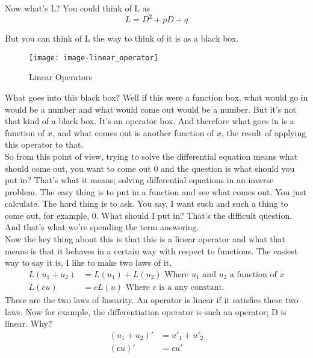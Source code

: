 \clearpage
Now what's L? You could think of L as
\begin{equation*}
  L = D^2 + pD + q 
\end{equation*}

But you can think of L the way to think of it is as a black box.
\begin{figure}[ht!]
  \centering
  \texttt{[image: image-linear\_operator]}
  \caption{Linear Operators}
\end{figure}

What goes into this black box? Well if this were a function box, what
would go in would be a number and what would come out would be a number.
But it's not that kind of a black box. It's an {\color{blue} operator box}.
And therefore what goes in is a function of $x$, and what comes out is another function of $x$,
the result of applying this operator to that.\\
So from this point of view, trying to solve the differential equation means what should come
out, you want to come out 0 and the question is what should you put in?
That's what it means; solving differential equations in an {\color{blue} inverse problem}.
The easy thing is to put in a function and see what comes out.
You just calculate. The hard thing is to ask.
You say, I want such and such a thing to come out, for example, $0$.
What should I put in? That's the difficult question.
And that's what we're spending the term answering.\\

Now the key thing about this is that this is a linear operator
and what that means is that it behaves in a certain way with respect to functions.
The easiest way to say it is, I like to make two laws of it,
\begin{align*}
  L(u _1 + u _2 ) &= L(u_1) + L(u_2)
  \text{ Where } u _1 \text{ and } u _2 \text{ a function of } x \\
  L(c u) &= c L(u) \text{ Where } c \text{ is a any constant. } 
\end{align*}
These are the two laws of linearity.
An operator is linear if it satisfies these two laws.
Now for example, the differentiation operator is such an operator; D is linear.
Why?
\begin{align*}
  (u _1 + u _2)' &= u' _1 + u' _2 \\
  (cu)' &= c u' 
\end{align*}

